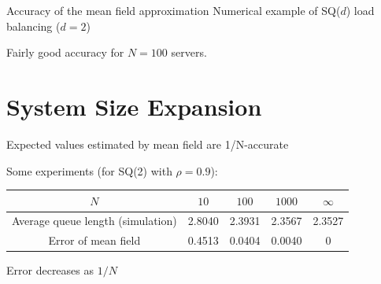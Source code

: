 \documentclass{beamer}
\begin{document}
\begin{frame}{Accuracy of the mean field approximation}
  {Numerical example of SQ($d$) load balancing ($d=2$)}


  \bigskip
  
  \alert{Fairly good accuracy for $N=100$ servers.}
\end{frame}

\section{System Size Expansion}

\begin{frame}{Expected values estimated by mean field are
    1/N-accurate}

    Some experiments (for SQ(2) with $\rho = 0.9$):
  \begin{tabular}{c|ccc|c}
    $N$&$10$&$100$&$1000$&$\infty$\\\hline
    Average queue length (simulation)&
    2.8040 &2.3931 &2.3567&2.3527\\ 
    Error of mean field &0.4513&0.0404&0.0040&0
  \end{tabular}
  
  \alert{Error decreases as $1/N$}
\end{frame}
\end{document}
